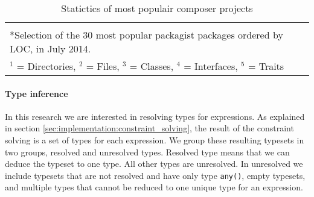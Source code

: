 \documentclass[../main.tex]{subfiles}
\begin{document}
\begin{table}[H]
\begin{tabular}{@{}lllrrrrrrrr@{}}
  \bottomrule
     \multicolumn{11}{l}{} \\
     \multicolumn{11}{l}{*Selection of the 30 most popular packagist packages ordered by LOC, in July 2014.} \\
     \multicolumn{11}{l}{$^1$ = Directories, $^2$ = Files, $^3$ = Classes, $^4$ = Interfaces, $^5$ = Traits} \\
  \end{tabular}
  \normalsize
  \caption{Statictics of most populair composer projects\label{table:corpus}}
\end{table}
\npfourdigitnosep
\npnoaddmissingzero

	\paragraph{Type inference}
	In this research we are interested in resolving types for expressions.
	As explained in section \ref{sec:implementation:constraint_solving}, the result of the constraint solving is a set of types for each expression.
	We group these resulting typesets in two groups, resolved and unresolved types.
	Resolved type means that we can deduce the typeset to one type.
	All other types are unresolved.
	In unresolved we include typesets that are not resolved and have only type \texttt{any()}, empty typesets, and multiple types that cannot be reduced to one unique type for an expression.
	
\end{document}
